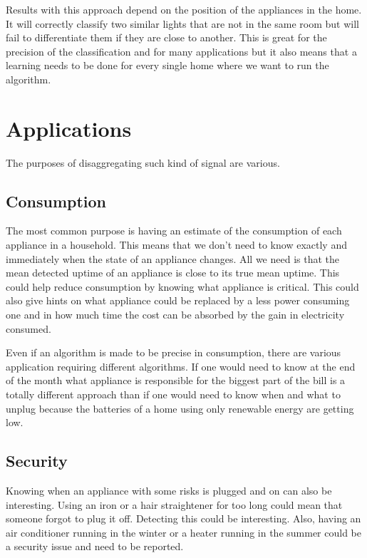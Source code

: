 Results with this approach depend on the position of the appliances in the home. It will correctly classify two similar lights that are not in the same room but will fail to differentiate them if they are close to another. This is great for the precision of the classification and for many applications but it also means that a learning needs to be done for every single home where we want to run the algorithm.



\cite{do2016applications}%

\section{Applications}\label{section-application}
The purposes of disaggregating such kind of signal are various.

\subsection{Consumption}
The most common purpose is having an estimate of the consumption of each appliance in a household. This means that we don't need to know exactly and immediately when the state of an appliance changes. All we need is that the mean detected uptime of an appliance is close to its true mean uptime. This could help reduce consumption by knowing what appliance is critical. This could also give hints on what appliance could be replaced by a less power consuming one and in how much time the cost can be absorbed by the gain in electricity consumed.

Even if an algorithm is made to be precise in consumption, there are various application requiring different algorithms. If one would need to know at the end of the month what appliance is responsible for the biggest part of the bill is a totally different approach than if one would need to know when and what to unplug because the batteries of a home using only renewable energy are getting low.

\subsection{Security}
Knowing when an appliance with some risks is plugged and on can also be interesting. Using an iron or a hair straightener for too long could mean that someone forgot to plug it off. Detecting this could be interesting. Also, having an air conditioner running in the winter or a heater running in the summer could be a security issue and need to be reported.

